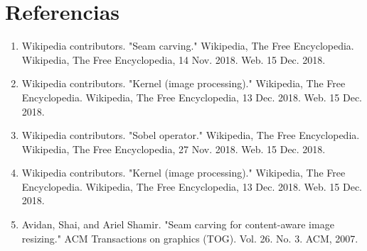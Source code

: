 \documentclass[12pt,a4paper,oneside]{article}
\begin{document}
\section{Referencias}
\begin{enumerate}
\item Wikipedia contributors. "Seam carving." Wikipedia, The Free Encyclopedia.
 Wikipedia, The Free Encyclopedia, 14 Nov. 2018. Web. 15 Dec. 2018.
\item Wikipedia contributors. "Kernel (image processing)." Wikipedia, The Free Encyclopedia.
 Wikipedia, The Free Encyclopedia, 13 Dec. 2018. Web. 15 Dec. 2018. 
\item Wikipedia contributors. "Sobel operator." Wikipedia, The Free Encyclopedia.
 Wikipedia, The Free Encyclopedia, 27 Nov. 2018. Web. 15 Dec. 2018. 
\item Wikipedia contributors. "Kernel (image processing)." Wikipedia, The Free Encyclopedia.
 Wikipedia, The Free Encyclopedia, 13 Dec. 2018. Web. 15 Dec. 2018. 
\item Avidan, Shai, and Ariel Shamir. "Seam carving for content-aware image resizing."
 ACM Transactions on graphics (TOG). Vol. 26. No. 3. ACM, 2007.
\end{enumerate}
\end{document}
